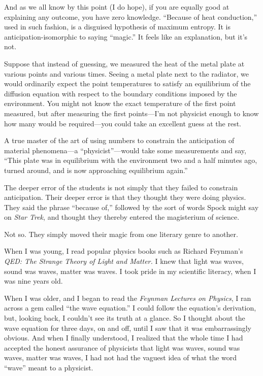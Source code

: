 {
 And as we all know by this point (I do hope), if you are equally
good at explaining any outcome, you have zero knowledge.
``Because of heat conduction,'' used
in such fashion, is a disguised hypothesis of maximum entropy. It is
anticipation-isomorphic to saying
``magic.'' It feels like an
explanation, but it's not.}

{
 Suppose that instead of guessing, we measured the heat of the
metal plate at various points and various times. Seeing a metal plate
next to the radiator, we would ordinarily expect the point temperatures
to satisfy an equilibrium of the diffusion equation with respect to the
boundary conditions imposed by the environment. You might not know the
exact temperature of the first point measured, but after measuring the
first points---I'm not physicist enough to know how
many would be required---you could take an excellent guess at the
rest.}

{
 A true master of the art of using numbers to constrain the
anticipation of material phenomena---a
``physicist''---would take some
measurements and say, ``This plate was in equilibrium
with the environment two and a half minutes ago, turned around, and is
now approaching equilibrium again.''}

{
 The deeper error of the students is not simply that they failed to
constrain anticipation. Their deeper error is that they thought they
were doing physics. They said the phrase ``because
of,'' followed by the sort of words Spock might say
on \textit{Star Trek}, and thought they thereby entered the magisterium
of science.}

{
 Not so. They simply moved their magic from one literary genre to
another.}

\myendsectiontext


\bigskip


{
 When I was young, I read popular physics books such as Richard
Feynman's \textit{QED: The Strange Theory of Light and
Matter.} I knew that light was waves, sound was waves, matter was
waves. I took pride in my scientific literacy, when I was nine years
old. }

{
 When I was older, and I began to read the \textit{Feynman Lectures
on Physics}, I ran across a gem called ``the wave
equation.'' I could follow the
equation's derivation, but, looking back, I
couldn't see its truth at a glance. So I thought about
the wave equation for three days, on and off, until I saw that it was
embarrassingly obvious. And when I finally understood, I realized that
the whole time I had accepted the honest assurance of physicists that
light was waves, sound was waves, matter was waves, I had not had the
vaguest idea of what the word
``wave'' meant to a physicist.}

